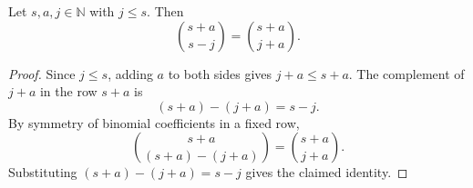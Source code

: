 \begin{helper}
Let \(s,a,j\in\mathbb N\) with \(j\le s\). Then
\[
  \binom{s+a}{s-j}=\binom{s+a}{j+a}.
\]
\end{helper}
\begin{proof}
Since \(j\le s\), adding \(a\) to both sides gives \(j+a\le s+a\).  The
complement of \(j+a\) in the row \(s+a\) is
\[
  (s+a)-(j+a)=s-j.
\]
By symmetry of binomial coefficients in a fixed row,
\[
  \binom{s+a}{(s+a)-(j+a)}=\binom{s+a}{j+a}.
\]
Substituting \((s+a)-(j+a)=s-j\) gives the claimed identity.
\end{proof}

